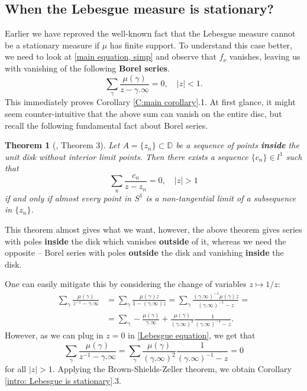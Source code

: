 \documentclass[11pt]{article}
\newtheorem{theorem}{Theorem}[section]
\begin{document}
\subsection{When the Lebesgue measure is stationary?}

Earlier we have reproved the well-known fact that the Lebesgue measure cannot be a stationary measure if $\mu$ has finite support. To understand this case better, we need to look at \eqref{main equation, simp} and observe that $f_\nu$ vanishes, leaving us with vanishing of the following \textbf{Borel series}.
\begin{equation}
	\label{Lebesgue equation}
	\sum_{\gamma} \frac{\mu(\gamma)}{z - \gamma.\infty} = 0, \quad |z| < 1.
\end{equation}
This immediately proves Corollary \ref{C:main corollary}.1. At first glance, it might seem counter-intuitive that the above sum can vanish on the entire disc, but recall the following fundamental fact about Borel series.


\begin{theorem}[\cite{brownsums}, Theorem 3]
	\label{non-tangential equiv rep}
	Let $A = \{ z_n \} \subset \mathbb{D}$ be a sequence of points \textbf{inside} the unit disk without interior limit points. Then there exists a sequence $\{c_n\} \in l^1$ such that
	\[
	\sum_n \frac{c_n}{z - z_n} = 0, \quad |z| > 1
	\]
	if and only if almost every point in $S^1$ is a non-tangential limit of a subsequence in $\{z_n\}$.
\end{theorem}

This theorem almost gives what we want, however, the above theorem gives series with poles \textbf{inside} the disk which vanishes \textbf{outside} of it, whereas we need the opposite -- Borel series with poles \textbf{outside} the disk and vanishing \textbf{inside} the disk.

One can easily mitigate this by considering the change of variables $z \mapsto 1/z$:
\[
\begin{aligned}
	\sum_{\gamma} \frac{\mu(\gamma)}{z^{-1} - \gamma.\infty} &= \sum_{\gamma} \frac{\mu(\gamma) z}{1 - (\gamma.\infty) z} = \sum_{\gamma} \frac{(\gamma.\infty)^{-1}  \mu(\gamma) z}{(\gamma.\infty)^{-1} -  z} = \\ 
	&= \sum_{\gamma} - \frac{\mu(\gamma)}{\gamma.\infty} + \frac{\mu(\gamma)}{(\gamma.\infty)^2} \frac{1}{(\gamma.\infty)^{-1} - z}.
\end{aligned}
\]
However, as we can plug in $z = 0$ in \eqref{Lebesgue equation}, we get that
\[
\sum_{\gamma} \frac{\mu(\gamma)}{z^{-1} - \gamma.\infty} = \sum_{\gamma}\frac{\mu(\gamma)}{(\gamma.\infty)^2} \frac{1}{(\gamma.\infty)^{-1} - z} = 0
\]
for all $|z| > 1$. Applying the Brown-Shields-Zeller theorem, we obtain Corollary \ref{intro: Lebesgue is stationary}.3.
\end{document}
